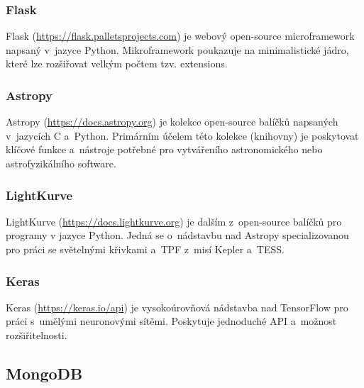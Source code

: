 \documentclass[a4paper,12pt]{article}
\begin{document}
{{{{{{{{\subsubsection{Flask}

Flask (\url{https://flask.palletsprojects.com}) je webový open-source microframework napsaný v~jazyce Python. Mikroframework poukazuje na minimalistické jádro, které lze rozšiřovat velkým počtem tzv. extensions.



\subsubsection{Astropy}

Astropy (\url{https://docs.astropy.org}) je kolekce open-source balíčků napsaných v~jazycích C a~Python. Primárním účelem této kolekce (knihovny) je poskytovat klíčové funkce a~nástroje potřebné pro vytvářeního astronomického nebo astrofyzikálního software.



\subsubsection{LightKurve}

LightKurve (\url{https://docs.lightkurve.org}) je dalším z~open-source balíčků pro programy v jazyce Python. Jedná se o~nádstavbu nad Astropy specializovanou pro práci se světelnými křivkami a~TPF z~misí Kepler a~TESS.



\subsubsection{Keras}

Keras (\url{https://keras.io/api}) je vysokoúrovňová nádstavba nad TensorFlow pro práci s~umělými neuronovými sítěmi. Poskytuje jednoduché API a~možnost rozšiřitelnosti.



\subsection{MongoDB}

}}}}}}}}
\end{document}
